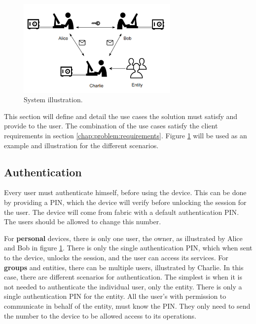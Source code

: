 \begin{figure}[h]
    \centering
    \includegraphics[width=0.7\textwidth]{./Images/main-figure.png}
    \caption{System illustration.}
    \label{fig:main-system}
\end{figure}

This section will define and detail the use cases the solution must satisfy and provide to the user. The combination of the use cases satisfy the client requirements in section \ref{chap:problem:requirements}.
Figure \ref{fig:main-system} will be used as an example and illustration for the different scenarios.

\subsection{Authentication}\label{chap:problem:scenarios:auth}

Every user must authenticate himself, before using the device. This can be done by providing a \ac{PIN}, which the device will verify before unlocking the session for the user.
The device will come from fabric with a default authentication \ac{PIN}. The users should be allowed to change this number.

For \textbf{personal} devices, there is only one user, the owner, as illustrated by Alice and Bob in figure \ref{fig:main-system}. There is only the single authentication \ac{PIN}, which when sent to the device, unlocks the session, and the user can access its services.
For \textbf{groups} and entities, there can be multiple users, illustrated by Charlie. In this case, there are different scenarios for authentication.
The simplest is when it is not needed to authenticate the individual user, only the entity. There is only a single authentication \ac{PIN} for the entity. All the user's with permission to communicate in behalf of the entity, must know the \ac{PIN}. They only need to send the number to the device to be allowed access to its operations.


